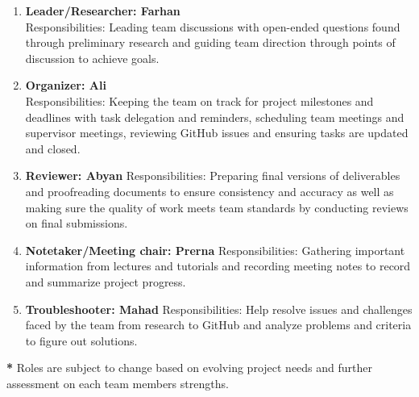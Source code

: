 \documentclass{article}
\begin{document}
\begin{enumerate}
    \item \textbf{Leader/Researcher: Farhan} \\
    Responsibilities: Leading team discussions with open-ended questions found through preliminary research and guiding team direction through points of discussion to achieve goals.
    \item \textbf{Organizer: Ali} \\
    Responsibilities: Keeping the team on track for project milestones and deadlines with task delegation and reminders, scheduling team meetings and supervisor meetings, reviewing GitHub issues and ensuring tasks are updated and closed.  \\
    \item \textbf{Reviewer: Abyan}
    Responsibilities: Preparing final versions of deliverables and proofreading documents to ensure consistency and accuracy as well as making sure the quality of work meets team standards by conducting reviews on final submissions. \\
    \item \textbf{Notetaker/Meeting chair: Prerna} 
    Responsibilities: Gathering important information from lectures and tutorials and recording meeting notes to record and summarize project progress. \\
    \item \textbf{Troubleshooter: Mahad}
    Responsibilities: Help resolve issues and challenges faced by the team from research to GitHub and analyze problems and criteria to figure out solutions.
\end{enumerate}
\noindent\textbf{*} Roles are subject to change based on evolving project needs and further assessment on each team members strengths.

\end{document}
